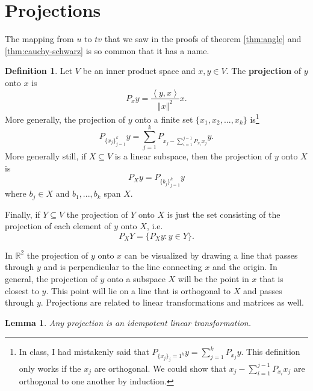 \documentclass[12pt,reqno]{amsart}
\newtheorem{lemma}{Lemma}[section]
\theoremstyle{definition}
\newtheorem{definition}{Definition}[section]
\def\R{\mathbb{R}}
\newcommand{\iprod}[2]{\left\langle {#1} , {#2} \right\rangle}
\newcommand{\norm}[1]{\left\Vert {#1} \right\Vert}
\begin{document}
\section{Projections}
The mapping from $u$ to $tv$ that we saw in the proofs of theorem
\ref{thm:angle} and \ref{thm:cauchy-schwarz} is so common that it has
a name.
\begin{definition}
  Let $V$ be an inner product space and $x,y \in V$. The
  \textbf{projection} of $y$ onto $x$ is 
  \[ P_x y = \frac{\iprod{y}{x}}{\norm{x}^2} x. \]
  More generally, the projection of $y$ onto a finite set $\{x_1, x_2,
  ... , x_k\}$ is\footnote{In class, I had mistakenly said that
    $P_{\{x_j\}_j=1^k} y = \sum_{j=1}^k P_{x_j} y$. This definition
    only works if the $x_j$ are orthogonal. We could show that $x_j
    -\sum_{i=1}^{j-1} P_{x_i} x_j$ are orthogonal to one another by
    induction.}
  \[ P_{\{x_j\}_{j=1}^k} y = \sum_{j=1}^k P_{x_j - \sum_{i=1}^{j-1}
    P_{x_i} x_j} y. \]
  More generally still, if $X \subseteq V$ is a linear subspace, then
  the projection of $y$ onto $X$ is
  \[ P_{X} y = P_{\{b_j\}_{j=1}^k} y \]
  where $b_j \in X$ and $b_1, ..., b_k$ span $X$. 
  
  Finally, if $Y \subseteq V$ the projection of $Y$ onto $X$ is just
  the set consisting of the projection of each element of $y$ onto
  $X$, i.e.
  \[ P_{X} Y = \{ P_{X} y : y \in Y \}. \]
\end{definition}
In $\R^2$ the projection of $y$ onto $x$ can be visualized by drawing
a line that passes through $y$ and is perpendicular to the line
connecting $x$ and the origin. In general, the projection of $y$
onto a subspace $X$ will be the point in $x$ that is closest to
$y$. This point will lie on a line that is orthogonal to $X$ and
passes through $y$. Projections are related to linear transformations
and matrices as well.
\begin{lemma}
  Any projection is an idempotent linear transformation. 
\end{lemma}
\end{document}
